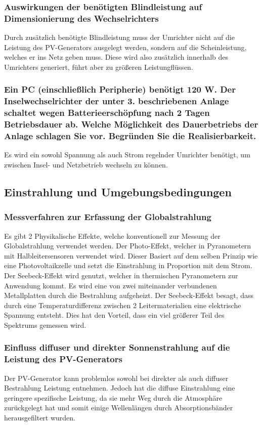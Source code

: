 \subsubsection{Auswirkungen der benötigten Blindleistung auf Dimensionierung des Wechselrichters}
Durch zusätzlich benötigte Blindleistung muss der Umrichter nicht auf die Leistung des PV-Generators ausgelegt werden, sondern auf die Scheinleistung, welches er ins Netz geben muss.
Diese wird also zusätzlich innerhalb des Umrichters generiert, führt aber zu größeren Leistungflüssen.\cite{SMA_Q-Auslegung}
\subsubsection{Ein PC (einschließlich Peripherie) benötigt 120 W. Der Inselwechselrichter der unter 3. beschriebenen Anlage schaltet wegen Batterieerschöpfung nach 2 Tagen Betriebsdauer ab. Welche Möglichkeit des Dauerbetriebs der Anlage schlagen Sie vor. Begründen Sie die Realisierbarkeit.}
Es wird ein sowohl Spannung als auch Strom regelnder Umrichter benötigt, um zwischen Insel- und Netzbetrieb wechseln zu können.
\newpage
\subsection{Einstrahlung und Umgebungsbedingungen}
\subsubsection{Messverfahren zur Erfassung der Globalstrahlung}
Es gibt 2 Physikalische Effekte, welche konventionell zur Messung der Globalstrahlung verwendet werden. 
Der Photo-Effekt, welcher in Pyranometern mit Halbleitersensoren verwendet wird. 
Dieser Basiert auf dem selben Prinzip wie eine Photovoltaikzelle und setzt die Einstrahlung in Proportion mit dem Strom.
Der Seebeck-Effekt wird genutzt, welcher in thermischen Pyranometern zur Anwendung kommt.
Es wird eine von zwei miteinander verbundenen Metallplatten durch die Bestrahlung aufgeheizt. 
Der Seebeck-Effekt besagt, dass durch eine Temperaturdifferenz zwischen 2 Leitermaterialien eine elektrische Spannung entsteht.\cite{Wiki-Seebeck}
Dies hat den Vorteil, dass ein viel größerer Teil des Spektrums gemessen wird.

\subsubsection{Einfluss diffuser und direkter Sonnenstrahlung auf die Leistung des PV-Generators}
Der PV-Generator kann problemlos sowohl bei direkter als auch diffuser Bestrahlung Leistung entnehmen. 
Jedoch hat die diffuse Einstrahlung eine geringere spezifische Leistung, da sie mehr Weg durch die Atmosphäre zurückgelegt hat und somit einige Wellenlängen durch Absorptionsbänder herausgefiltert wurden.

